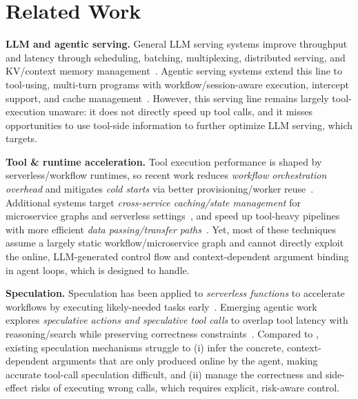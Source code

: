 \section{Related Work}

\textbf{LLM and agentic serving.}
General LLM serving systems improve throughput and latency through scheduling, batching, multiplexing, distributed serving, and KV/context memory management~\cite{kwon2023efficient,agrawal2024sarathiserve,wu2023fast,duan2024muxserve,qiao2024conserve,qiu2024efficient,li2025throughput,pan2025kvflow,kim2025kvzip,cai2025rkv,yang2025kvlink,hu2024epic,xie2025strata,prabhu2024vattention}.
Agentic serving systems extend this line to tool-using, multi-turn programs with workflow/session-aware execution, intercept support, and cache management~\cite{luo2025autellix,parrot24,zhang2026megaflow,giusti2025federation,zhang2025ufo3,guo2025agenticlybic,zheng2024sglang,abhyankar2024infercept,wang2025augserve,zhai2026toolcaching,xu2025alignment,li2026continuum,chen2026concur,kang2026thunderagent,zheng2026efficient,xia2026idleness}.
However, this serving line remains largely tool-execution unaware: it does not directly speed up tool calls, and it misses opportunities to use tool-side information to further optimize LLM serving, which \sys{} targets.

\textbf{Tool \& runtime acceleration.}
Tool execution performance is shaped by serverless/workflow runtimes, so recent work reduces \emph{workflow orchestration overhead} and mitigates \emph{cold starts} via better provisioning/worker reuse~\cite{liu2023unum,joosen2025serverless,liu2024jiagu,prewarm}.
Additional systems target \emph{cross-service caching/state management} for microservice graphs and serverless settings~\cite{zhang2024mucache,zhang2025causalmesh}, and speed up tool-heavy pipelines with more efficient \emph{data passing/transfer paths}~\cite{marcelino2024truffle,wu2024faastube,marcelino2025databelt}.
Yet, most of these techniques assume a largely static workflow/microservice graph and cannot directly exploit the online, LLM-generated control flow and context-dependent argument binding in agent loops, which \sys{} is designed to handle.

\textbf{Speculation.}
Speculation has been applied to \emph{serverless functions} to accelerate workflows by executing likely-needed tasks early~\cite{stojkovic2023specfaas}.
Emerging agentic work explores \emph{speculative actions and speculative tool calls} to overlap tool latency with reasoning/search while preserving correctness constraints~\cite{ye2025speculative,huang2025reducing,nichols2025spectoocalls}. Compared to \sys{}, existing speculation mechanisms struggle to (i) infer the concrete, context-dependent arguments that are only produced online by the agent, making accurate tool-call speculation difficult, and (ii) manage the correctness and side-effect risks of executing wrong calls, which requires explicit, risk-aware control.
















